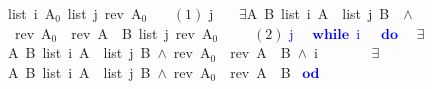\documentclass[twoside,runningheads,envcountsame,envcountsect,oribibl,orivec]{llncs}
\newcommand{\wwhile}{\mathbf{while}}
\newcommand{\ddo}{\mathbf{do}}
\newcommand{\ood}{\mathbf{od}}
\begin{document}
\begin{figure}
\begin{isabellebody}
\isanewline

{\isasymlbrakk}
	list\ {\isacharbackquote}i\ A$_0${\isacharcomma}\ 
	list\ {\isacharbackquote}j\ {\isacharparenleft}rev\ A$_0${\isacharparenright}
{\isasymrbrakk}
\isanewline\ \ \ {\isasymsqsubseteq}\hfill $(1)$\isanewline
{\isacharbackquote}j\ {\isacharcolon}{\isacharequal}\ {}{\isacharsemicolon}\ 
\isanewline
{\isasymlbrakk}
	$\exists$A\ B{\isachardot}\ {\isacharparenleft}list\ {\isacharbackquote}i\ A\ {\isacharasterisk}\ list\ {\isacharbackquote}j\ B\ {\isacharparenright}\ $\wedge$\ {\isacharparenleft}rev\ A$_0${\isacharparenright}\ {\isacharequal}\ {\isacharparenleft}rev\ A{\isacharparenright}\ {\isacharat}\ B{\isacharcomma}\ 
list\ {\isacharbackquote}j\ {\isacharparenleft}rev\ A$_0${\isacharparenright}\ {\isasymrbrakk}\ 
\isanewline\ \ \ {\isasymsqsubseteq}\hfill $(2)$\isanewline
\textcolor{blue}{{\isacharbackquote}j\ {\isacharcolon}{\isacharequal}\ {}{\isacharsemicolon}}\isanewline
\textcolor{blue}{$\wwhile$\ {\isacharbackquote}i\ {\isasymnoteq}\ {\isadigit{0}}\ $\ddo$}\isanewline
\ \ {\isasymlbrakk}{\isacharparenleft}$\exists$A\ B{\isachardot}\ {\isacharparenleft}list\ {\isacharbackquote}i\ A\ {\isacharasterisk}\ list\ {\isacharbackquote}j\ B{\isacharparenright}\ $\wedge$\ {\isacharparenleft}rev\ A$_0${\isacharparenright}\ {\isacharequal}\ {\isacharparenleft}rev\ A{\isacharparenright}\ {\isacharat}\ B{\isacharparenright}\ $\wedge$\ {\isacharbackquote}i\ {\isasymnoteq}\ {}{\isacharcomma}\ \isanewline
\ \ \ \ $\exists$A\ B{\isachardot}\ {\isacharparenleft}list\ {\isacharbackquote}i\ A\ {\isacharasterisk}\ list\ {\isacharbackquote}j\ B{\isacharparenright}\ $\wedge$\ {\isacharparenleft}rev\ A$_0${\isacharparenright}\ {\isacharequal}\ {\isacharparenleft}rev\ A{\isacharparenright}\ {\isacharat}\ B\ {\isasymrbrakk}\isanewline
\textcolor{blue}{$\ood$}\

\isanewline 


\end{isabellebody}
\end{figure}
\end{document}
